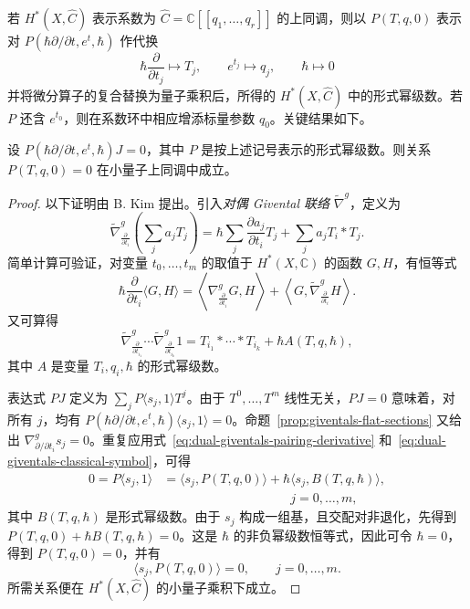 若 $H^*(X,\widehat C)$ 表示系数为 $\widehat C=\mathbb C[[q_1,\ldots,q_r]]$ 的上同调，则以 $P(T,q,0)$ 表示对 $P(\hbar\partial/\partial t,e^t,\hbar)$ 作代换
\[
\hbar\frac{\partial}{\partial t_j}\longmapsto T_j,
\qquad e^{t_j}\longmapsto q_j,\qquad\hbar\longmapsto0
\]
并将微分算子的复合替换为量子乘积后，所得的 $H^*(X,\widehat C)$ 中的形式幂级数。若 $P$ 还含 $e^{t_0}$，则在系数环中相应增添标量参数 $q_0$。关键结果如下。
\begin{theorem}\label{thm:quantum-differential-relations}
设 $P(\hbar\partial/\partial t,e^t,\hbar)J=0$，其中 $P$ 是按上述记号表示的形式幂级数。则关系 $P(T,q,0)=0$ 在小量子上同调中成立。
\end{theorem}
\begin{proof}
以下证明由 B. Kim 提出。引入\emph{对偶 Givental 联络} $\widetilde\nabla^g$，定义为
\[
\widetilde\nabla^g_{\frac{\partial}{\partial t_i}}\left(\sum_j a_jT_j\right)
=\hbar\sum_j\frac{\partial a_j}{\partial t_i}T_j
+\sum_j a_jT_i*T_j.
\]
简单计算可验证，对变量 $t_0,\ldots,t_m$ 的取值于 $H^*(X,\mathbb C)$ 的函数 $G,H$，有恒等式
\begin{equation}\label{eq:dual-giventals-pairing-derivative}
\hbar\frac{\partial}{\partial t_i}\langle G,H\rangle
=\left\langle\nabla^g_{\frac{\partial}{\partial t_i}}G,H\right\rangle
+\left\langle G,\widetilde\nabla^g_{\frac{\partial}{\partial t_i}}H\right\rangle.
\end{equation}
又可算得
\begin{equation}\label{eq:dual-giventals-classical-symbol}
\widetilde\nabla^g_{\frac{\partial}{\partial t_{i_1}}}\cdots
\widetilde\nabla^g_{\frac{\partial}{\partial t_{i_k}}}1
=T_{i_1}*\cdots*T_{i_k}+\hbar A(T,q,\hbar),
\end{equation}
其中 $A$ 是变量 $T_i,q_i,\hbar$ 的形式幂级数。

表达式 $PJ$ 定义为 $\sum_jP\langle s_j,1\rangle T^j$。由于 $T^0,\ldots,T^m$ 线性无关，$PJ=0$ 意味着，对所有 $j$，均有 $P(\hbar\partial/\partial t,e^t,\hbar)\langle s_j,1\rangle=0$。命题~\ref{prop:giventals-flat-sections} 又给出 $\nabla^g_{\partial/\partial t_i}s_j=0$。重复应用式~\eqref{eq:dual-giventals-pairing-derivative} 和~\eqref{eq:dual-giventals-classical-symbol}，可得
\[
\begin{aligned}
0=P\langle s_j,1\rangle
&=\langle s_j,P(T,q,0)\rangle
+\hbar\langle s_j,B(T,q,\hbar)\rangle,\\[-2pt]
&\hspace{10em}j=0,\ldots,m,
\end{aligned}
\]
其中 $B(T,q,\hbar)$ 是形式幂级数。由于 $s_j$ 构成一组基，且交配对非退化，先得到 $P(T,q,0)+\hbar B(T,q,\hbar)=0$。这是 $\hbar$ 的非负幂级数恒等式，因此可令 $\hbar=0$，得到 $P(T,q,0)=0$，并有
\[
\langle s_j,P(T,q,0)\rangle=0,\qquad j=0,\ldots,m.
\]
所需关系便在 $H^*(X,\widehat C)$ 的小量子乘积下成立。
\end{proof}

